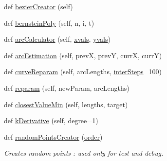 \begin{DoxyCompactItemize}
\item 
def \hyperlink{classcmd__TTB_1_1trajFactory_1_1TrajFactory_adf0c25d8eff9beec92a446c5760461f2}{bezier\+Creator} (self)
\item 
def \hyperlink{classcmd__TTB_1_1trajFactory_1_1TrajFactory_a48fe4e9a265feb014636f95a78ef9b5d}{bernstein\+Poly} (self, n, i, t)
\item 
def \hyperlink{classcmd__TTB_1_1trajFactory_1_1TrajFactory_acc57a6b5cfceae963504a58aeab2f64b}{arc\+Calculator} (self, \hyperlink{namespacecmd__TTB_1_1trajFactory_ac955d640aed48051089654bf294a2001}{xvals}, \hyperlink{namespacecmd__TTB_1_1trajFactory_a7a877f7cdb271eb3276d034ab078d600}{yvals})
\item 
def \hyperlink{classcmd__TTB_1_1trajFactory_1_1TrajFactory_acfd20cd19f21c36b2fd7984248e1cf67}{arc\+Estimation} (self, prevX, prevY, currX, currY)
\item 
def \hyperlink{classcmd__TTB_1_1trajFactory_1_1TrajFactory_a40ca5d2425c4d55a179c6baca0bd0f8a}{curve\+Reparam} (self, arc\+Lengths, \hyperlink{classcmd__TTB_1_1trajFactory_1_1TrajFactory_a17391e139222a91451f87e07e96f0952}{inter\+Steps}=100)
\item 
def \hyperlink{classcmd__TTB_1_1trajFactory_1_1TrajFactory_a967b160b18d8cba7b7abc1e18b12a097}{reparam} (self, new\+Param, arc\+Lengths)
\item 
def \hyperlink{classcmd__TTB_1_1trajFactory_1_1TrajFactory_a5ad86ca0a0a192cefe4f99ccb721a1f3}{closest\+Value\+Min} (self, lengths, target)
\item 
def \hyperlink{classcmd__TTB_1_1trajFactory_1_1TrajFactory_a5e4439aaa52686151386178e9a614ae8}{k\+Derivative} (self, degree=1)
\item 
def \hyperlink{classcmd__TTB_1_1trajFactory_1_1TrajFactory_af1baefcdfad72a13172064443b29e8dc}{random\+Points\+Creator} (\hyperlink{classcmd__TTB_1_1trajFactory_1_1TrajFactory_a3a21023c80037375f39420be4c5d2097}{order})
\begin{DoxyCompactList}\small\item\em Creates random points \+: used only for test and debug. \end{DoxyCompactList}\end{DoxyCompactItemize}
